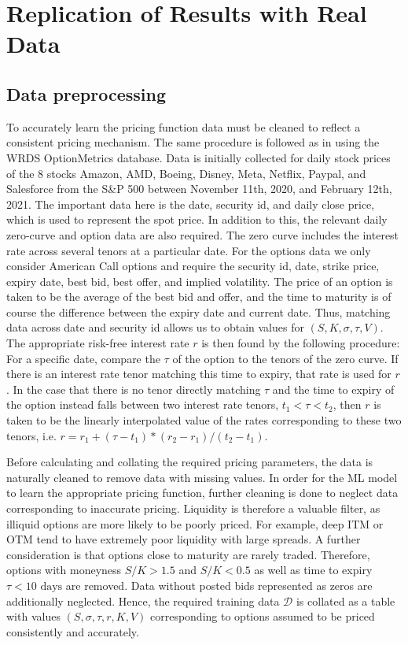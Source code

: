 \documentclass{article}
\theoremstyle{definition}
\begin{document}
\section{Replication of Results with Real Data} \label{sec:real1}

\subsection{Data preprocessing}
To accurately learn the pricing function data must be cleaned to reflect a consistent pricing mechanism. The same procedure is followed as in \cite{bastos} using the WRDS OptionMetrics database. Data is initially collected for daily stock prices of the 8 stocks Amazon, AMD, Boeing, Disney, Meta, Netflix, Paypal, and Salesforce from the S\&P 500 between November 11th, 2020, and February 12th, 2021. The important data here is the date, security id, and daily close price, which is used to represent the spot price. In addition to this, the relevant daily zero-curve and option data are also required. The zero curve includes the interest rate across several tenors at a particular date. For the options data we only consider American Call options and require the security id, date, strike price, expiry date, best bid, best offer, and implied volatility. The price of an option is taken to be the average of the best bid and offer, and the time to maturity is of course the difference between the expiry date and current date. Thus, matching data across date and security id allows us to obtain values for $(S, K, \sigma, \tau, V)$. The appropriate risk-free interest rate $r$ is then found by the following procedure: For a specific date, compare the $\tau$ of the option to the tenors of the zero curve. If there is an interest rate tenor matching this time to expiry, that rate is used for $r$. In the case that there is no tenor directly matching $\tau$ and the time to expiry of the option instead falls between two interest rate tenors, $t_1 < \tau < t_2$, then $r$ is taken to be the linearly interpolated value of the rates corresponding to these two tenors, i.e. $r = r_1 + (\tau-t_1)*(r_2 - r_1)/(t_2-t_1)$. 

Before calculating and collating the required pricing parameters, the data is naturally cleaned to remove data with missing values. In order for the ML model to learn the appropriate pricing function, further cleaning is done to neglect data corresponding to inaccurate pricing. Liquidity is therefore a valuable filter, as illiquid options are more likely to be poorly priced. For example, deep ITM or OTM tend to have extremely poor liquidity with large spreads. A further consideration is that options close to maturity are rarely traded. Therefore, options with moneyness $S/K > 1.5$ and $S/K < 0.5$ as well as time to expiry $\tau < \text{10 days}$ are removed. Data without posted bids represented as zeros are additionally neglected. Hence, the required training data $\mathcal{D}$ is collated as a table with values $(S, \sigma, \tau, r, K, V)$ corresponding to options assumed to be priced consistently and accurately.
\end{document}
